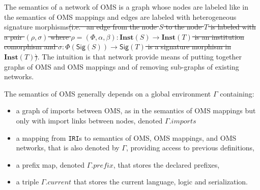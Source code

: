 \documentclass[10pt,fleqn,final]{scrreprt}
\newcommand*{\syntax}[1]{\texttt{#1}}
\newcommand{\Sig}{\mathsf{Sig}}
\newcommand{\Inst}{\ensuremath{\mathbf{Inst}}}
\newcommand{\prefix}{\mathit{prefix}}
\newcommand{\current}{\mathit{current}}
\newenvironment{definitions}[0]{\medskip }{}
\providecommand{\DIFdel}[1]{{\protect\color{red}\sout{#1}}}                      %
\providecommand{\DIFdelbegin}{} %
\providecommand{\DIFdelend}{} %
\begin{document}
\begin{definitions}
The semantics of a network of OMS is a graph
whose nodes are labeled like in the semantics of OMS mappings and 
edges are labeled with heterogeneous signature morphisms\DIFdelbegin \DIFdel{(i.e.~ 
an edge from the node $S$ to the node $T$ is labeled with a pair 
$(\rho, \sigma)$ where $\rho=(\Phi,\alpha,\beta):\Inst(S)\to\Inst(T)$ is an institution comorphism and
$\sigma:\Phi(\Sig(S))\to\Sig(T)$ is a signature morphism in $\Inst(T)$)}\DIFdelend . 
The intuition is that
network provide means of putting together graphs of OMS and OMS mappings
and of removing sub-graphs of existing networks. 

The semantics of OMS generally depends on a global environment
$\Gamma$ containing:
 \begin{itemize}
    \item a graph of imports between OMS, as in the semantics of OMS mappings but
          only with import links between nodes, denoted $\Gamma.imports$
    \item a mapping from \syntax{IRI}s to semantics of OMS, OMS mappings, and OMS networks, that 
               is also denoted by $\Gamma$, providing access to previous definitions,
    \item a prefix map, denoted $\Gamma.\prefix$, that stores the declared prefixes,
    \item a triple $\Gamma.\current$ that stores the current language, logic and serialization. 
 \end{itemize}


\end{definitions}
\end{document}
